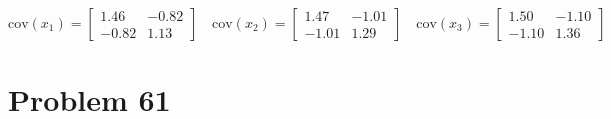 \documentclass[a4paper, 11pt]{article}
\begin{document}
\begin{equation}
\text{cov}(x_1) = \begin{bmatrix}
1.46 & -0.82 \\
-0.82 & 1.13
\end{bmatrix} \quad \text{cov}(x_2) = \begin{bmatrix}
1.47 & -1.01 \\
-1.01 & 1.29
\end{bmatrix} \quad \text{cov}(x_3) = \begin{bmatrix}
1.50 & -1.10 \\
-1.10 & 1.36
\end{bmatrix}
\end{equation}




\section*{Problem 61}
\end{document}
